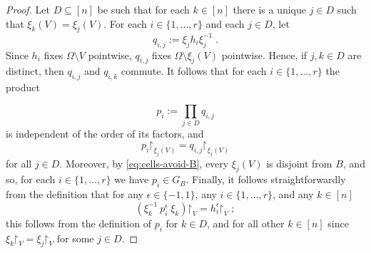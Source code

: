 \documentclass{article}
\theoremstyle{remark}
\theoremstyle{definition}
\newenvironment{subproof}[1][\proofname]{%
  \renewcommand{\qedsymbol}{$\blacksquare$}%
  \begin{proof}[#1]%
}{%
  \end{proof}%
}
\begin{document}
{\begin{proof}
 Let $D\subseteq [n]$ be such that for each $k\in [n]$ %
 there is a unique $j\in D$ such that $\xi_k(V)=\xi_j(V)$. For each 
$i\in\{1,\ldots,r\}$ and each $j\in D$, let
\[
  q_{i,j}:=\xi_{j}h_i \xi_{j}^{-1}\; .
\]
Since $h_i$ fixes $\Omega\setminus V$ pointwise,  $q_{i,j}$ fixes
$\Omega\setminus \xi_j(V)$ pointwise. Hence, if $j,k\in D$ are distinct, then $q_{i,j}$ and $q_{i,k}$ commute. %
It follows that for each $i\in\{1, \dots, r\}$ the product 

\begin{equation}\label{eq:patched-variable}
  p_i:=\prod_{j\in {D}}
  q_{i,j} 
\end{equation}
is independent of the order of its factors, and 
\begin{equation}\label{eq:restriction-to-cell}
  p_i\mathord\upharpoonright_{\xi_j(V)}
  =q_{i,j}\mathord\upharpoonright_{\xi_j(V)}
\end{equation}
for all %
 $j\in D$.
Moreover, by \eqref{eq:cells-avoid-B}, every $\xi_j(V)$ is disjoint
from $B$, and so, for each $i\in\{1, \dots, r\}$ we have  $p_i\in G_B$. Finally, it follows straightforwardly from the definition that {for any  ${\epsilon}\in\{-1,1\}$, any $i\in\{1,\ldots,r\}$, and any $k\in[n]$}
\begin{equation}\label{eq:coordinate-action}
  (\xi_k^{-1}\ p_i^{{{\epsilon}}}\ \xi_k)\mathord\upharpoonright_V
  =h_i^{{{\epsilon}}} \mathord\upharpoonright_V\; ;
\end{equation}
{this follows from the definition of $p_i$ for $k\in D$, and for all other $k\in [n]$ since $\xi_k\mathord\upharpoonright_V=\xi_j\mathord\upharpoonright_V$ for some $j\in D$.}

\end{proof}}
\end{document}
